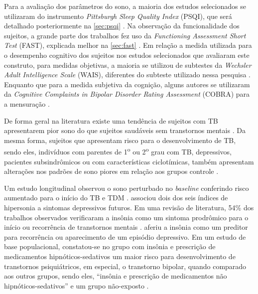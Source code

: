 \documentclass[chapter=TITLE,
               oneside,
               12pt,
               a4paper,
               english,
               brazil]{abntex2}    %
\begin{document}
        Para a avaliação dos parâmetros do sono, a maioria dos estudos selecionados
        se utilizaram do instrumento \textit{Pittsburgh Sleep Quality Index} (PSQI),
        que será detalhado posteriormente na \autoref{sec:psqi}
        \parencite{buysse_pittsburgh_1989}.
        Na observação da funcionalidade dos sujeitos, a grande parte dos trabalhos
        fez uso da \textit{Functioning Assessment Short Test} (FAST), explicada
        melhor na \autoref{sec:fast}
        \parencite{rosa_validity_2007}.
        Em relação a medida utilizada para o desempenho cognitivo dos sujeitos nos
        estudos selecionados que avaliaram este construto, para medidas objetivas,
        a maioria se utilizou de subtestes da
        \textit{Wechsler Adult Intelligence Scale} (WAIS),
        diferentes do subteste utilizado nessa pesquisa
        \parencite{wechsler_wais_2004}.
        Enquanto que para a medida subjetiva da cognição, alguns autores 
        se utilizaram da
        \textit{Cognitive Complaints in Bipolar Disorder Rating Assessment} (COBRA)
        para a mensuração
        \parencite{luo_subjective_2020,
        lin_associations_2019}.

        De forma geral na literatura existe uma tendência de sujeitos com TB
        apresentarem pior sono do que sujeitos saudáveis sem transtornos mentais
        \parencite{boland_associations_2015,
        russo_relationship_2015,
        lai_familiality_2014,
        bradley_sleep_2017,
        st-amand_sleep_2013,
        slyepchenko_association_2019}.
        Da mesma forma, sujeitos que apresentam risco para o desenvolvimento de TB,
        sendo eles, indivíduos com parentes de
        1\textsuperscript{o} ou 2\textsuperscript{o}
        grau com TB, depressivos, pacientes subsindrômicos ou com características
        ciclotímicas, também apresentam alterações nos padrões de
        sono piores em relação aos grupos controle
        \parencite{zanini_abnormalities_2015,
        ritter_characteristics_2012}.

        Um estudo longitudinal observou o sono perturbado no \textit{baseline}
        conferindo risco aumentado para o início do TB e TDM
        \parencite{ritter_disturbed_2015}.
        \textcite{kaplan_hypersomnia_2011} associou dois dos seis índices
        de hipersonia a sintomas depressivos futuros. 
        Em uma revisão de literatura, 54\% dos trabalhos observados verificaram
        a insônia como um sintoma prodrômico para o início ou recorrência
        de transtornos mentais
        \parencite{van_meter_bipolar_2016}.
        \textcite{andrade-gonzalez_initial_2020} aferiu a insônia como um
        preditor para recorrência ou aparecimento de um episódio depressivo. 
        Em um estudo de base populacional, constatou-se no grupo com insônia
        e prescrição de medicamentos hipnóticos-sedativos um maior risco
        para desenvolvimento de transtornos psiquiátricos, em especial,
        o transtorno bipolar, quando comparado aos outros grupos, sendo 
        eles, ``insônia e prescrição de medicamentos não hipnóticos-sedativos''
        e um grupo não-exposto
        \parencite{chung_risk_2015}.
\end{document}
